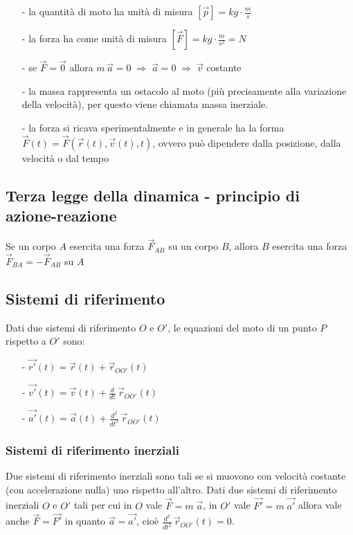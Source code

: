 \documentclass[a4paper]{article}
\newcommand\dt{\frac{d}{dt}\,}
\newcommand\dts{\frac{d^2}{dt^2}\,}
\begin{document}
\begin{itemize}[topsep=3pt, itemsep=0pt]
	\item[-] la quantità di moto ha unità di misura \(\displaystyle \left[\vec{p}\right] = kg \cdot \frac{m}{s}\)
	\item[-] la forza ha come unità di misura \(\displaystyle \left[\vec{F}\right] = kg \cdot \frac{m}{s^2} = N\)
	\item[-] se \(\vec{F} = \vec{0}\) allora \(m \, \vec{a} = 0 \; \Rightarrow \; \vec{a} = 0 \; \Rightarrow \; \vec{v}\) costante
	\item[-] la massa rappresenta un ostacolo al moto (più precisamente alla variazione della velocità), per questo viene chiamata massa inerziale.
	\item[-] la forza si ricava sperimentalmente e in generale ha la forma \(\vec{F}(t) = \vec{F}(\vec{r}(t), \vec{v}(t), t)\), ovvero può dipendere
	dalla posizione, dalla velocità o dal tempo
\end{itemize}

\subsection{Terza legge della dinamica - principio di azione-reazione}
Se un corpo \(A\) esercita una forza \(\vec{F}_{AB}\) su un corpo \(B\), allora \(B\) esercita una forza \(\vec{F}_{BA} = -\vec{F}_{AB}\) su \(A\)

\subsection{Sistemi di riferimento}
Dati due sistemi di riferimento \(O\) e \(O'\), le equazioni del moto di un punto \(P\) rispetto a \(O'\) sono:
\begin{itemize}[topsep=3pt, itemsep=0pt]
	\item[-] \(\vec{r'}(t) = \vec{r}(t) + \vec{r}_{OO'}(t)\)
	\item[-] \(\vec{v'}(t) = \vec{v}(t) + \dt \vec{r}_{OO'}(t)\)
	\item[-] \(\vec{a'}(t) = \vec{a}(t) + \dts \vec{r}_{OO'}(t)\)
\end{itemize}

\subsubsection*{Sistemi di riferimento inerziali}
Due sistemi di riferimento inerziali sono tali se si muovono con velocità costante (con accelerazione nulla) uno rispetto all'altro.
Dati due sistemi di riferimento inerziali \(O\) e \(O'\) tali per cui in \(O\) vale \(\vec{F} = m \; \vec{a}\), in \(O'\) vale \(\vec{F'} = m \; \vec{a'}\)
allora vale anche \(\vec{F} = \vec{F'}\) in quanto \(\vec{a} = \vec{a'}\), cioè \(\displaystyle \dts \vec{r}_{OO'}(t) = 0\).
\end{document}
